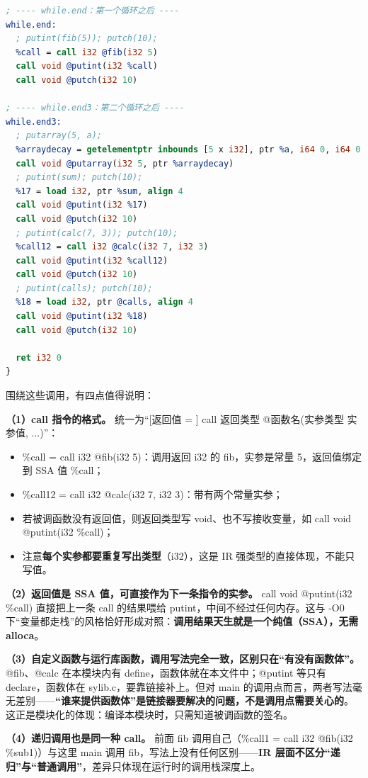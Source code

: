 \documentclass[UTF8,a4paper,10pt]{ctexart}
\begin{document}
\begin{lstlisting}[language=LLVM]
; ---- while.end：第一个循环之后 ----
while.end:
  ; putint(fib(5)); putch(10);
  %call = call i32 @fib(i32 5)
  call void @putint(i32 %call)
  call void @putch(i32 10)

; ---- while.end3：第二个循环之后 ----
while.end3:
  ; putarray(5, a);
  %arraydecay = getelementptr inbounds [5 x i32], ptr %a, i64 0, i64 0
  call void @putarray(i32 5, ptr %arraydecay)
  ; putint(sum); putch(10);
  %17 = load i32, ptr %sum, align 4
  call void @putint(i32 %17)
  call void @putch(i32 10)
  ; putint(calc(7, 3)); putch(10);
  %call12 = call i32 @calc(i32 7, i32 3)
  call void @putint(i32 %call12)
  call void @putch(i32 10)
  ; putint(calls); putch(10);
  %18 = load i32, ptr @calls, align 4
  call void @putint(i32 %18)
  call void @putch(i32 10)

  ret i32 0
}
\end{lstlisting}

围绕这些调用，有四点值得说明：

\textbf{（1）call 指令的格式。} 统一为“[返回值 = ] call 返回类型 @函数名(实参类型 实参值, ...)”：

\begin{itemize}
  \item \%call = call i32 @fib(i32 5)：调用返回 i32 的 fib，实参是常量 5，返回值绑定到 SSA 值 \%call；
  \item \%call12 = call i32 @calc(i32 7, i32 3)：带有两个常量实参；
  \item 若被调函数没有返回值，则返回类型写 void、也不写接收变量，如 call void @putint(i32 \%call)；
  \item 注意\textbf{每个实参都要重复写出类型}（i32），这是 IR 强类型的直接体现，不能只写值。
\end{itemize}

\textbf{（2）返回值是 SSA 值，可直接作为下一条指令的实参。} call void @putint(i32 \%call) 直接把上一条 call 的结果喂给 putint，中间不经过任何内存。这与 -O0 下“变量都走栈”的风格恰好形成对照：\textbf{调用结果天生就是一个纯值（SSA），无需 alloca}。

\textbf{（3）自定义函数与运行库函数，调用写法完全一致，区别只在“有没有函数体”。} @fib、@calc 在本模块内有 define，函数体就在本文件中；@putint 等只有 declare，函数体在 sylib.c，要靠链接补上。但对 main 的调用点而言，两者写法毫无差别——\textbf{“谁来提供函数体”是链接器要解决的问题，不是调用点需要关心的}。这正是模块化的体现：编译本模块时，只需知道被调函数的签名。

\textbf{（4）递归调用也是同一种 call。} 前面 fib 调用自己（\%call1 = call i32 @fib(i32 \%sub1)）与这里 main 调用 fib，写法上没有任何区别——\textbf{IR 层面不区分“递归”与“普通调用”}，差异只体现在运行时的调用栈深度上。
\end{document}
